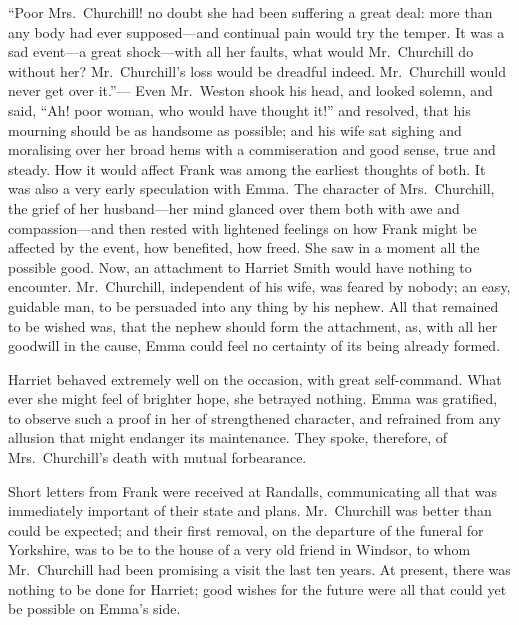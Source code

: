 ``Poor Mrs.\ Churchill! no doubt she had been suffering a great deal:
more than any body had ever supposed---and continual pain would try
the temper.  It was a sad event---a great shock---with all her faults,
what would Mr.\ Churchill do without her?  Mr.\ Churchill's loss
would be dreadful indeed.  Mr.\ Churchill would never get over it.''---%
Even Mr.\ Weston shook his head, and looked solemn, and said,
``Ah! poor woman, who would have thought it!'' and resolved, that his
mourning should be as handsome as possible; and his wife sat sighing
and moralising over her broad hems with a commiseration and good sense,
true and steady.  How it would affect Frank was among the earliest
thoughts of both.  It was also a very early speculation with Emma.
The character of Mrs.\ Churchill, the grief of her husband---her mind
glanced over them both with awe and compassion---and then rested
with lightened feelings on how Frank might be affected by the event,
how benefited, how freed.  She saw in a moment all the possible good.
Now, an attachment to Harriet Smith would have nothing to encounter.
Mr.\ Churchill, independent of his wife, was feared by nobody;
an easy, guidable man, to be persuaded into any thing by his nephew.
All that remained to be wished was, that the nephew should form
the attachment, as, with all her goodwill in the cause, Emma could feel
no certainty of its being already formed.

Harriet behaved extremely well on the occasion, with great self-command.
What ever she might feel of brighter hope, she betrayed nothing.  Emma was
gratified, to observe such a proof in her of strengthened character,
and refrained from any allusion that might endanger its maintenance.
They spoke, therefore, of Mrs.\ Churchill's death with mutual forbearance.

Short letters from Frank were received at Randalls, communicating
all that was immediately important of their state and plans.
Mr.\ Churchill was better than could be expected; and their
first removal, on the departure of the funeral for Yorkshire,
was to be to the house of a very old friend in Windsor, to whom
Mr.\ Churchill had been promising a visit the last ten years.
At present, there was nothing to be done for Harriet; good wishes
for the future were all that could yet be possible on Emma's side.

